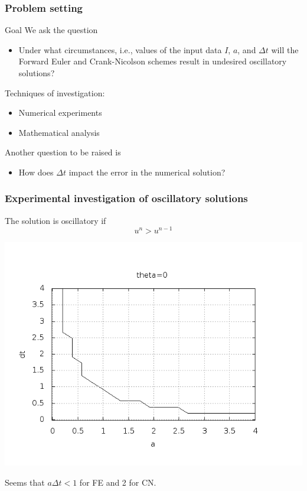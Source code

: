 \documentclass{beamer}
\begin{document}
\begin{frame}
\frametitle{Problem setting}

\begin{block}{Goal }
We ask the question

\begin{itemize}
  \item Under what circumstances, i.e., values of
    the input data $I$, $a$, and $\Delta t$ will the Forward Euler and
    Crank-Nicolson schemes result in undesired oscillatory solutions?
\end{itemize}

\noindent
Techniques of investigation:

\begin{itemize}
 \item Numerical experiments

 \item Mathematical analysis
\end{itemize}

\noindent
Another question to be raised is

\begin{itemize}
 \item How does $\Delta t$ impact the error in the numerical solution?
\end{itemize}

\noindent
\end{block}
\end{frame}

\begin{frame}
\frametitle{Experimental investigation of oscillatory solutions}

The solution is oscillatory if
\[ u^{n} > u^{n-1}\]



\centerline{\includegraphics[width=0.9\linewidth]{fig-analysis/osc_region_FE.png}}



Seems that $a\Delta t < 1$ for FE and 2 for CN.
\end{frame}
\end{document}
